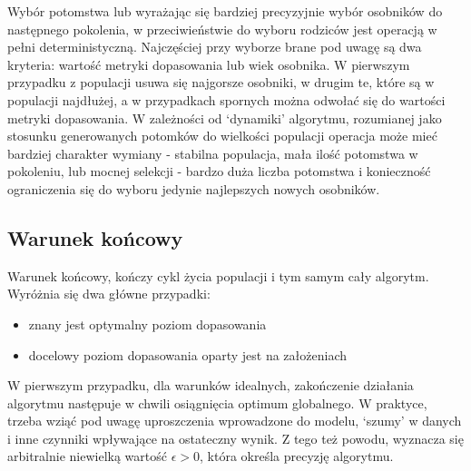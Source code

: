 \documentclass[a4paper,11pt]{article}
\begin{document}
    Wybór potomstwa lub wyrażając się bardziej precyzyjnie wybór osobników do następnego pokolenia, w przeciwieństwie do wyboru rodziców jest operacją w pełni deterministyczną. Najczęściej przy wyborze brane pod uwagę są dwa kryteria: wartość metryki dopasowania lub wiek osobnika. W pierwszym przypadku z populacji usuwa się najgorsze osobniki, w drugim te, które są w populacji najdłużej, a w przypadkach spornych można odwołać się do wartości metryki dopasowania. W zależności od `dynamiki' algorytmu, rozumianej jako stosunku generowanych potomków do wielkości populacji operacja może mieć bardziej charakter wymiany - stabilna populacja, mała ilość potomstwa w pokoleniu, lub mocnej selekcji - bardzo duża liczba potomstwa i konieczność ograniczenia się do wyboru jedynie najlepszych nowych osobników\cite{IntroductionToEvolutionaryComputing2015}.

    \subsection{Warunek końcowy}

    \noindent
    \begin{minipage}[H]{\textwidth}
        \setlength\parindent{17pt} Warunek końcowy, kończy cykl życia populacji i tym samym cały algorytm. Wyróżnia się dwa główne przypadki\cite{IntroductionToEvolutionaryComputing2015}:
        \begin{itemize}
            \item znany jest optymalny poziom dopasowania
            \item docelowy poziom dopasowania oparty jest na założeniach
        \end{itemize}
    \end{minipage}

    \bigskip

    W pierwszym przypadku, dla warunków idealnych, zakończenie działania algorytmu następuje w chwili osiągnięcia optimum globalnego. W praktyce, trzeba wziąć pod uwagę uproszczenia wprowadzone do modelu, `szumy' w danych i inne czynniki wpływające na ostateczny wynik. Z tego też powodu, wyznacza się arbitralnie niewielką wartość $\epsilon > 0$, która określa precyzję algorytmu\cite{IntroductionToEvolutionaryComputing2015}.

    \bigskip
\end{document}
